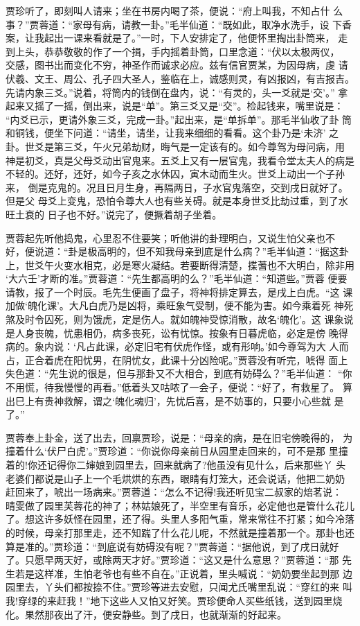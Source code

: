贾珍听了，即刻叫人请来；坐在书房内喝了茶，便说：“府上叫我，不知占什
么事？”贾蓉道：“家母有病，请教一卦。”毛半仙道：“既如此，取净水洗手，设
下香案，让我起出一课来看就是了。”一时，下人安排定了，他便怀里掏出卦筒来，
走到上头，恭恭敬敬的作了一个揖，手内摇着卦筒，口里念道：“伏以太极两仪，
交感，图书出而变化不穷，神圣作而诚求必应。兹有信官贾某，为因母病，虔
请伏羲、文王、周公、孔子四大圣人，鉴临在上，诚感则灵，有凶报凶，有吉报吉。
先请内象三爻。”说着，将筒内的钱倒在盘内，说：“有灵的，头一爻就是‘交’。”
拿起来又摇了一摇，倒出来，说是“单”。第三爻又是“交”。检起钱来，嘴里说是：
“内爻已示，更请外象三爻，完成一卦。”起出来，是“单拆单”。那毛半仙收了卦
筒和铜钱，便坐下问道：“请坐，请坐，让我来细细的看看。这个卦乃是‘未济’
之卦。世爻是第三爻，午火兄弟劫财，晦气是一定该有的。如今尊驾为母问病，用
神是初爻，真是父母爻动出官鬼来。五爻上又有一层官鬼，我看令堂太夫人的病是
不轻的。还好，还好，如今子亥之水休囚，寅木动而生火。世爻上动出一个子孙来，
倒是克鬼的。况且日月生身，再隔两日，子水官鬼落空，交到戌日就好了。但是父
母爻上变鬼，恐怕令尊大人也有些关碍。就是本身世爻比劫过重，到了水旺土衰的
日子也不好。”说完了，便撅着胡子坐着。

贾蓉起先听他捣鬼，心里忍不住要笑；听他讲的卦理明白，又说生怕父亲也不
好，便说道：“卦是极高明的，但不知我母亲到底是什么病？”毛半仙道：“据这卦
上，世爻午火变水相克，必是寒火凝结。若要断得清楚，揲蓍也不大明白，除非用
‘大六壬’才断的准。”贾蓉道：“先生都高明的么？”毛半仙道：“知道些。”贾蓉
便要请教，报了一个时辰。毛先生便画了盘子，将神将排定算去，是戌上白虎。“这
课加做‘魄化课’。大凡白虎乃是凶将，乘旺象气受制，便不能为害。如今乘着死
神死煞及时令囚死，则为饿虎，定是伤人。就如魄神受惊消散，故名‘魄化’。这
课象说是人身丧魄，忧患相仍，病多丧死，讼有忧惊。按象有日暮虎临，必定是傍
晚得病的。象内说：‘凡占此课，必定旧宅有伏虎作怪，或有形响。’如今尊驾为大
人而占，正合着虎在阳忧男，在阴忧女，此课十分凶险呢。”贾蓉没有听完，唬得
面上失色道：“先生说的很是，但与那卦又不大相合，到底有妨碍么？”毛半仙道：
“你不用慌，待我慢慢的再看。”低着头又咕哝了一会子，便说：“好了，有救星了。
算出巳上有贵神救解，谓之‘魄化魂归’，先忧后喜，是不妨事的，只要小心些就
是了。”

贾蓉奉上卦金，送了出去，回禀贾珍，说是：“母亲的病，是在旧宅傍晚得的，
为撞着什么‘伏尸白虎’。”贾珍道：“你说你母亲前日从园里走回来的，可不是那
里撞着的!你还记得你二婶娘到园里去，回来就病了?他虽没有见什么，后来那些丫
头老婆们都说是山子上一个毛烘烘的东西，眼睛有灯笼大，还会说话，他把二奶奶
赶回来了，唬出一场病来。”贾蓉道：“怎么不记得!我还听见宝二叔家的焙茗说：
晴雯做了园里芙蓉花的神了；林姑娘死了，半空里有音乐，必定他也是管什么花儿
了。想这许多妖怪在园里，还了得。头里人多阳气重，常来常往不打紧；如今冷落
的时候，母亲打那里走，还不知踹了什么花儿呢，不然就是撞着那一个。那卦也还
算是准的。”贾珍道：“到底说有妨碍没有呢？”贾蓉道：“据他说，到了戌日就好
了。只愿早两天好，或除两天才好。”贾珍道：“这又是什么意思？”贾蓉道：“那
先生若是这样准，生怕老爷也有些不自在。”正说着，里头喊说：“奶奶要坐起到那
边园里去，丫头们都按捺不住。”贾珍等进去安慰，只闻尤氏嘴里乱说：“穿红的来
叫我!穿绿的来赶我！”地下这些人又怕又好笑。贾珍便命人买些纸钱，送到园里烧
化。果然那夜出了汗，便安静些。到了戌日，也就渐渐的好起来。

